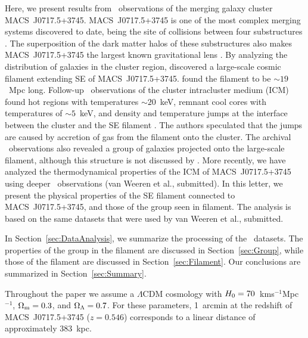 Here, we present results from \chandra\ observations of the merging galaxy cluster MACS~J0717.5+3745. MACS~J0717.5+3745 \citep[$z=0.546$;][]{Ebeling2001, Ebeling2007} is one of the most complex merging systems discovered to date, being the site of collisions between four substructures \citep{Ma2009, Medezinski2013}. The superposition of the dark matter halos of these substructures also makes MACS~J0717.5+3745 the largest known gravitational lens \citep{Zitrin2009, Medezinski2013}. By analyzing the distribution of galaxies in the cluster region, \citet{Ebeling2004} discovered a large-scale cosmic filament extending SE of MACS~J0717.5+3745. \citet{Jauzac2012} found the filament to be $\sim 19$~Mpc long. Follow-up \chandra\ observations of the cluster intracluster medium (ICM) found hot regions with temperatures $\sim 20$~keV, remnant cool cores with temperatures of $\sim 5$~keV, and density and temperature jumps at the interface between the cluster and the SE filament \citet{Ma2009}. The authors speculated that the jumps are caused by accretion of gas from the filament onto the cluster. The archival \chandra\ observations also revealed a group of galaxies projected onto the large-scale filament, although this structure is not discussed by \citet{Ma2009}. More recently, we have analyzed the thermodynamical properties of the ICM of MACS~J0717.5+3745 using deeper \chandra\ observations (van Weeren et al., submitted). In this letter, we present the physical properties of the SE filament connected to MACS~J0717.5+3745, and those of the group seen in filament. The analysis is based on the same datasets that were used by van Weeren et al., submitted.

In Section~\ref{sec:DataAnalysis}, we summarize the processing of the \chandra\ datasets. The properties of the group in the filament are discussed in Section~\ref{sec:Group}, while those of the filament are discussed in Section~\ref{sec:Filament}. Our conclusions are summarized in Section~\ref{sec:Summary}.

Throughout the paper we assume a $\Lambda$CDM cosmology with $H_{\rm 0} = 70$~km\;s$^{-1}$\;Mpc$^{-1}$, $\Omega_{\rm m} = 0.3$, and $\Omega_{\rm \Lambda} = 0.7$. For these parameters, 1~arcmin at the redshift of MACS~J0717.5+3745 ($z=0.546$) corresponds to a linear distance of approximately 383~kpc. 

